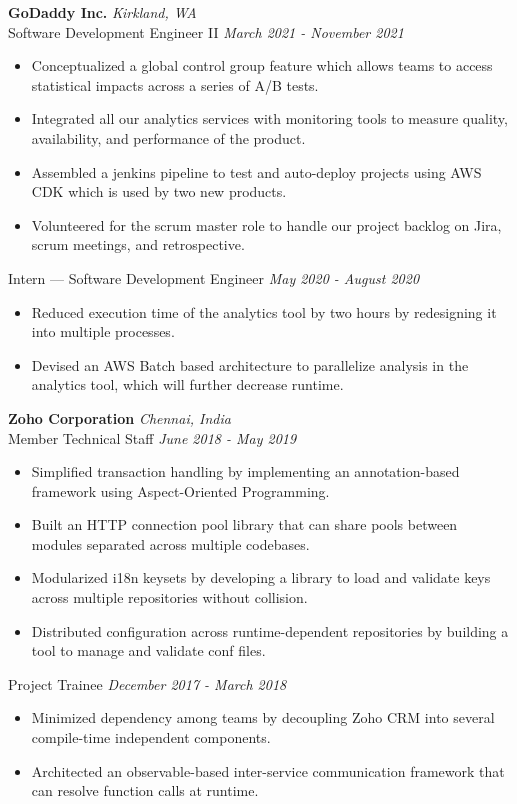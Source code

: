 \documentclass{resume}
\begin{document}
\textbf{GoDaddy Inc.} \hfill \textit{Kirkland, WA} \\
{\small Software Development Engineer II} \hfill \textit{\small March 2021 - November 2021}
\begin{itemize}
  \item Conceptualized a global control group feature which allows teams to access statistical impacts across a series of A/B tests.
  \item Integrated all our analytics services with monitoring tools to measure quality, availability, and performance of the product.
  \item Assembled a jenkins pipeline to test and auto-deploy projects using AWS CDK which is used by two new products.
  \item Volunteered for the scrum master role to handle our project backlog on Jira, scrum meetings, and retrospective.
\end{itemize}
{\small Intern --- Software Development Engineer} \hfill \textit{\small May 2020 - August 2020}
\begin{itemize}
  \item Reduced execution time of the analytics tool by two hours by redesigning it into multiple processes.
  \item Devised an AWS Batch based architecture to parallelize analysis in the analytics tool, which will further decrease runtime.
\end{itemize}
\textbf{Zoho Corporation} \hfill \textit{Chennai, India} \\
{\small Member Technical Staff} \hfill \textit{\small June 2018 - May 2019}
\begin{itemize}
  \item Simplified transaction handling by implementing an annotation-based framework using Aspect-Oriented Programming.
  \item Built an HTTP connection pool library that can share pools between modules separated across multiple codebases.
  \item Modularized i18n keysets by developing a library to load and validate keys across multiple repositories without collision.
  \item Distributed configuration across runtime-dependent repositories by building a tool to manage and validate conf files.
\end{itemize}
{\small Project Trainee} \hfill \textit{\small December 2017 - March 2018}
\begin{itemize}
  \item Minimized dependency among teams by decoupling Zoho CRM into several compile-time independent components.
  \item Architected an observable-based inter-service communication framework that can resolve function calls at runtime.
\end{itemize}
\end{document}
